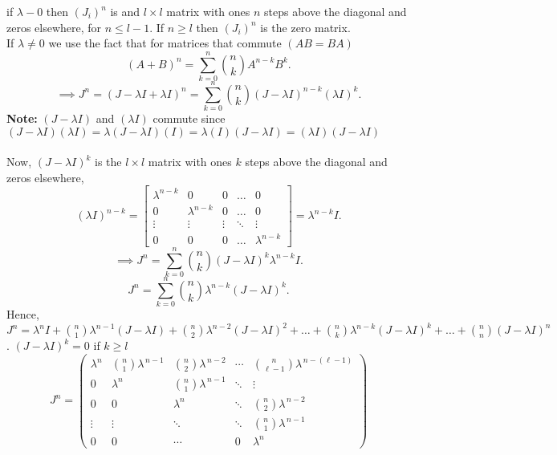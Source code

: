 \documentclass{report}
\begin{document}
 if $ \lambda -0$ then $ \left( J_i \right) ^{n}$ is and $ l \times  l$ matrix with ones $ n$ steps above the diagonal and zeros elsewhere, for $ n \leq l -1$. If $ n \ge l$ then $ \left( J_i \right) ^{n}$ is the zero matrix.\\
 If $ \lambda \neq 0 $ we use the fact that for matrices that commute $ \left( AB = BA \right) $
 \[
 \left( A+B \right) ^{n} = \sum_{k=0}^{n} \binom{n}{k} A^{n-k} B^{k}
 .\] 
 \[
 \implies J^{n} = \left( J - \lambda I + \lambda I \right) ^{n} = \sum_{k=0}^{n} \binom{n}{k} \left( J - \lambda I \right) ^{n-k} \left( \lambda I \right) ^{k}
 .\] 
 \textbf{Note:} $ \left( J - \lambda I \right) $ and $ \left( \lambda I \right) $ commute since $ \left( J - \lambda I \right) \left( \lambda I \right) = \lambda \left( J - \lambda I  \right) \left( I \right) = \lambda \left( I \right) \left( J - \lambda I  \right) = \left( \lambda I \right) \left( J- \lambda I \right) $ \\
 \\
 Now, $ \left( J -  \lambda I \right)^{k} $ is the $ l \times  l$ matrix with ones $ k$ steps above the diagonal and zeros elsewhere,
 \[
 \left( \lambda I \right) ^{ n-k} = \begin{bmatrix}
 \lambda ^{n-k} & 0 & 0 & \dots  & 0 \\
 0 & \lambda ^{n-k} & 0 & \dots  & 0 \\
 \vdots & \vdots & \vdots & \ddots & \vdots \\
 0 & 0 & 0 & \dots  &  \lambda ^{n-k}\end{bmatrix}    = \lambda ^{n-k} I
 .\] 
 \[
 \implies J ^{n} = \sum_{k=0}^{n} \binom{n}{k} \left( J - \lambda I \right) ^{k} \lambda ^{n-k} I
 .\] 
 \[
 J ^{n} =  \sum_{k=0}^{n} \binom{n}{k} \lambda ^{n-k} \left( J - \lambda I \right) ^{k} 
 .\] 
 Hence, $ J ^{n}= \lambda ^{n} I + \binom{n}{1} \lambda ^{ n-1} \left( J - \lambda I \right) + \binom{n}{2} \lambda ^{ n-2} \left( J - \lambda I \right) ^2 + \ldots + \binom{n}{k} \lambda ^{n-k} \left( J - \lambda I \right) ^{k}+ \ldots + \binom{n}{n} \left( J - \lambda I \right) ^{n} \qquad $.   $ \left( J - \lambda I \right) ^{k }=0$ if $ k \ge l$ \\
  \[
J^{n}=%
\begin{pmatrix}
\lambda^{n} & \binom{n}{1}\lambda^{\,n-1} & \binom{n}{2}\lambda^{\,n-2} & \cdots & \binom{n}{\ell-1}\lambda^{\,n-(\ell-1)}\\[4pt]
0          & \lambda^{n}                  & \binom{n}{1}\lambda^{\,n-1} & \ddots & \vdots\\[4pt]
0          & 0                           & \lambda^{n}                  & \ddots & \binom{n}{2}\lambda^{\,n-2}\\[4pt]
\vdots     & \vdots                      & \ddots                       & \ddots & \binom{n}{1}\lambda^{\,n-1}\\[4pt]
0          & 0                           & \cdots                       & 0      & \lambda^{n}
\end{pmatrix}
\]
\end{document}
